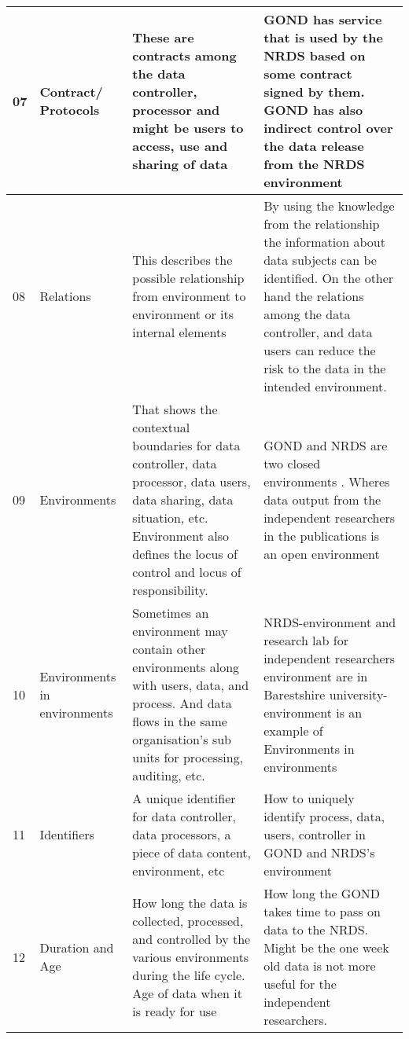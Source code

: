 \begin{longtable}{|p{0.5cm}|p{2.5cm}|p{4cm}|p{6cm}|}
\hline
07 &  Contract/ Protocols &  These are contracts among the data controller, processor and might be users to access, use and sharing of data  &  GOND has service that is used by the NRDS  based on some contract signed by them. GOND has also indirect control over the data release from the NRDS environment  \\
\hline
08 &  Relations &  This describes the possible  relationship from environment to environment or its internal elements    &  By using the knowledge from the relationship the information about data subjects can be identified. On the other hand the relations among the data controller, and data users can reduce the risk to the data in the intended environment. \\

\hline
09 &  Environments &  That shows the contextual boundaries for data controller, data processor,  data users,  data sharing, data situation, etc. Environment also defines the locus of control and locus of responsibility.  & GOND and NRDS are two closed environments . Wheres data output from the independent researchers in the publications is an open environment \\
\hline
10 &  Environments in environments &  Sometimes an environment may contain other environments along with users, data, and process. And data flows in the same organisation's sub units for processing, auditing, etc. & NRDS-environment and research lab for independent researchers environment are in  Barestshire university-environment is an example of Environments in environments \\
\hline
11 &  Identifiers &  A unique identifier for data controller, data processors, a piece of data content, environment, etc & How to uniquely identify process, data, users, controller in GOND and NRDS's environment   \\
\hline
12 & Duration and Age & How long the data is collected, processed, and controlled by the various environments during the life cycle. Age of data when it is ready for use  & How long the GOND takes time to pass on data to the NRDS. Might be the one week old data is not more useful for the independent researchers.   \\
\hline
\end{longtable}


